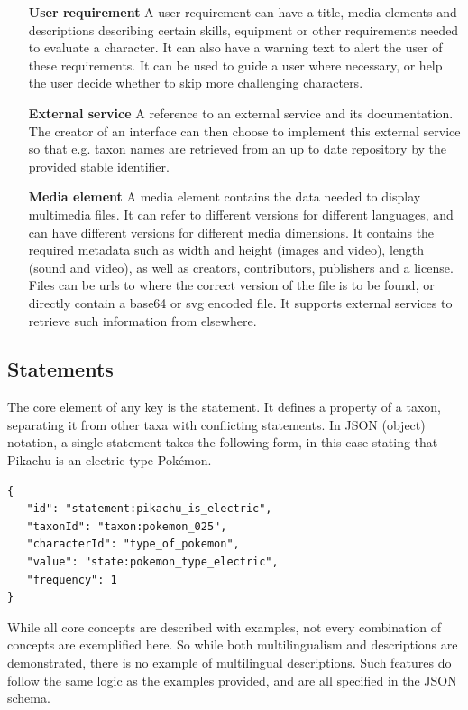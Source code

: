 \documentclass[10pt,letterpaper]{article}
\begin{document}
\begin{itemize}
\item[\textbf{User requirement}]
A user requirement can have a title, media elements and descriptions describing certain skills, equipment or other requirements needed to evaluate a character. It can also have a warning text to alert the user of these requirements. It can be used to guide a user where necessary, or help the user decide whether to skip more challenging characters.
\item[\textbf{External service}]
A reference to an external service and its documentation. The creator of an interface can then choose to implement this external service so that e.g. taxon names are retrieved from an up to date repository by the provided stable identifier.
\item[\textbf{Media element}]
A media element contains the data needed to display multimedia files. It can refer to different versions for different languages, and can have different versions for different media dimensions. It contains the required metadata such as width and height (images and video), length (sound and video), as well as creators, contributors, publishers and a license. Files can be urls to where the correct version of the file is to be found, or directly contain a base64 or svg encoded file. It supports external services to retrieve such information from elsewhere.


\end{itemize}

\subsection*{
Statements
}

The core element of any key is the statement. It defines a property of a taxon, separating it from other taxa with conflicting statements. In JSON (object) notation, a single statement takes the following form, in this case stating that Pikachu is an electric type Pokémon.

\begin{verbatim}
{
   "id": "statement:pikachu_is_electric",
   "taxonId": "taxon:pokemon_025",
   "characterId": "type_of_pokemon",
   "value": "state:pokemon_type_electric",
   "frequency": 1
}

\end{verbatim}

While all core concepts are described with examples, not every combination of concepts are exemplified here. So while both multilingualism and descriptions are demonstrated, there is no example of multilingual descriptions. Such features do follow the same logic as the examples provided, and are all specified in the JSON schema.
\end{document}

